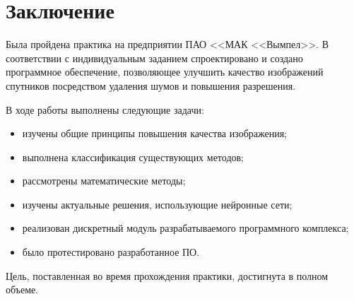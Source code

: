 \chapter*{Заключение}

Была пройдена практика на предприятии ПАО <<МАК <<Вымпел>>. В соответствии с индивидуальным заданием спроектировано и создано программное обеспечение, позволяющее улучшить качество изображений спутников посредством удаления шумов и повышения разрешения.

В ходе работы выполнены следующие задачи:
\begin{itemize}
	\item изучены общие принципы повышения качества изображения;
	\item выполнена классификация существующих методов;
	\item рассмотрены математические методы;
	\item изучены актуальные решения, использующие нейронные сети;
	\item реализован дискретный модуль разрабатываемого программного комплекса;
	\item было протестировано разработанное ПО.
\end{itemize}

Цель, поставленная во время прохождения практики, достигнута в полном объеме.


